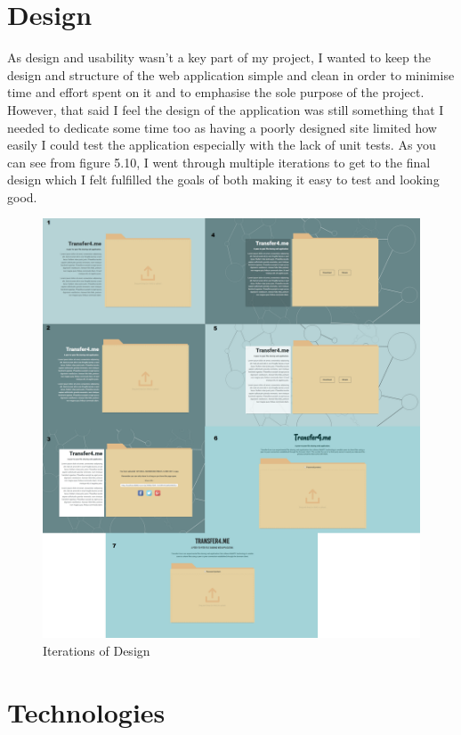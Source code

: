 \documentclass[]{report}
\begin{document}
				
		\section{Design}			
			As design and usability wasn't a key part of my project, I wanted to keep the design and structure of the web application simple and clean in order to minimise time and effort spent on it and to emphasise the sole purpose of the project. However, that said I feel the design of the application was still something that I needed to dedicate some time too as having a poorly designed site limited how easily I could test the application especially with the lack of unit tests. As you can see from figure 5.10, I went through multiple iterations to get to the final design which I felt fulfilled the goals of both making it easy to test and looking good.
	
			\begin{figure}[H]
				\caption{Iterations of Design}
				\centering
				\includegraphics[scale=0.15]{design.png}
			\end{figure}
		
		\section{Technologies}
\end{document}
